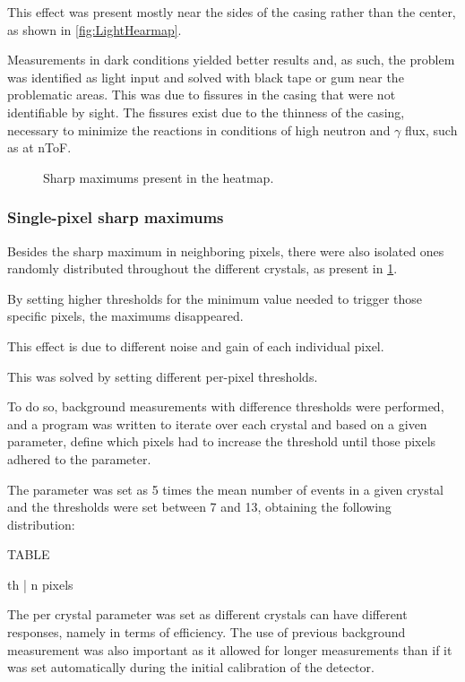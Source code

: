 This effect was present mostly near the sides of the casing rather than the center, as shown in \ref{fig:LightHearmap}.

Measurements in dark conditions yielded better results and, as such, the problem was identified as light input and solved with black tape or gum near the problematic areas. This was due to fissures in the casing that were not identifiable by sight. The fissures exist due to the thinness of the casing, necessary to minimize the reactions in conditions of high neutron and $\gamma$ flux, such as at \ac{nToF}.

\begin{figure}[h!]
    \centering
    \qquad
    \caption{Sharp maximums present in the heatmap.}%
    \label{fig:LightHeatmap}
\end{figure}

\subsubsection{Single-pixel sharp maximums}

Besides the sharp maximum in neighboring pixels, there were also isolated ones randomly distributed throughout the different crystals, as present in \ref{fig:LightHeatmap}.

By setting higher thresholds for the minimum value needed to trigger those specific pixels, the maximums disappeared.

This effect is due to different noise and gain of each individual pixel.

This was solved by setting different per-pixel thresholds.

To do so, background measurements with difference thresholds were performed, and a program was written to iterate over each crystal and based on a given parameter, define which pixels had to increase the threshold until those pixels adhered to the parameter.

The parameter was set as 5 times the mean number of events in a given crystal and the thresholds were set between 7 and 13, obtaining the following distribution:

TABLE

th | n pixels

The per crystal parameter was set as different crystals can have different responses, namely in terms of efficiency. The use of previous background measurement was also important as it allowed for longer measurements than if it was set automatically during the initial calibration of the detector.

